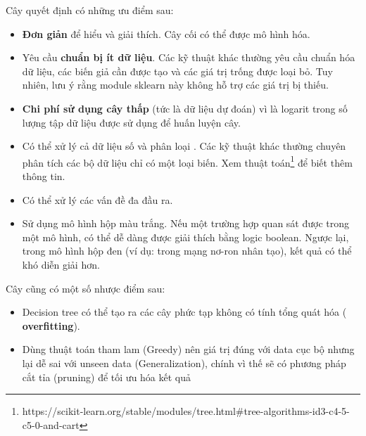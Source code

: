 \documentclass[lineno]{biometrika}
\begin{document}
Cây quyết định có những ưu điểm sau:
\begin{itemize}
    \item \textbf{Đơn giản} để hiểu và giải thích. Cây cối có thể được mô hình hóa.
    \item Yêu cầu \textbf{chuẩn bị ít dữ liệu}. Các kỹ thuật khác thường yêu cầu chuẩn hóa dữ liệu, các biến giả cần được tạo và các giá trị trống được loại bỏ. Tuy nhiên, lưu ý rằng module sklearn này không hỗ trợ các giá trị bị thiếu.
    \item \textbf{Chi phí sử dụng cây thấp} (tức là dữ liệu dự đoán) vì là logarit trong số lượng tập dữ liệu được sử dụng để huấn luyện cây.

    \item Có thể xử lý cả dữ liệu số và phân loại . Các kỹ thuật khác thường chuyên phân tích các bộ dữ liệu chỉ có một loại biến. Xem thuật toán\footnote{https://scikit-learn.org/stable/modules/tree.html#tree-algorithms-id3-c4-5-c5-0-and-cart} để biết thêm thông tin.
    \item Có thể xử lý các vấn đề đa đầu ra.

    \item Sử dụng mô hình hộp màu trắng. Nếu một trường hợp  quan sát được trong một mô hình, có thể dễ dàng được giải thích bằng logic boolean. Ngược lại, trong mô hình hộp đen (ví dụ: trong mạng nơ-ron nhân tạo), kết quả có thể khó diễn giải hơn.
\end{itemize}

Cây cũng có một số nhược điểm sau:

\begin{itemize}
    \item Decision tree có thể tạo ra các cây phức tạp không có tính tổng quát hóa ( \textbf{overfitting}).
    \item Dùng thuật toán tham lam (Greedy) nên giá trị đúng với data cục bộ nhưng lại dễ sai với unseen data (Generalization), chính vì thế sẽ có phương pháp cắt tỉa (pruning) để tối ưu hóa kết quả 

\end{itemize}
\end{document}
